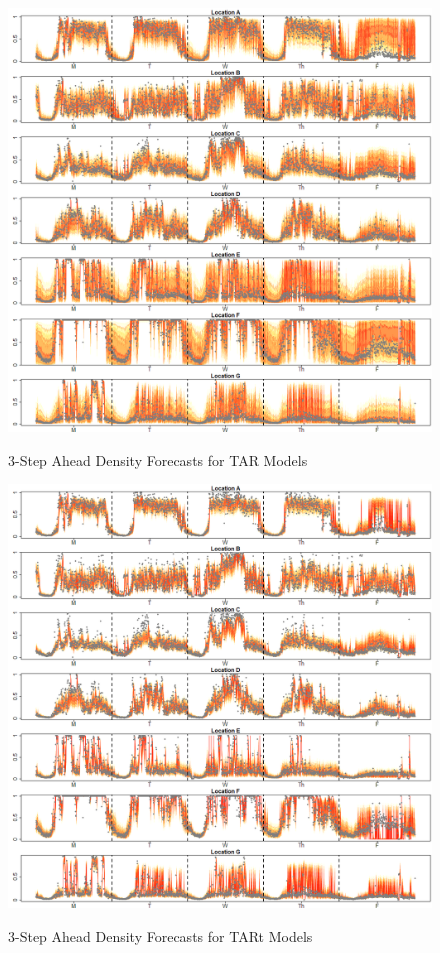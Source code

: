 \begin{figure}[htbp]
\caption{3-Step Ahead Density Forecasts for TAR Models}
\includegraphics[width=\textwidth]{DENS3Plots}
\label{fig:DENS3Plots}
\end{figure}

\begin{figure}[htbp]
\caption{3-Step Ahead Density Forecasts for TARt Models}
\includegraphics[width=\textwidth]{DENS3tPlots}
\label{fig:DENS3tPlots}
\end{figure}

